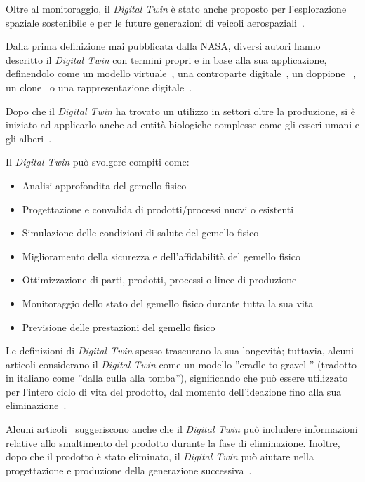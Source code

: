 Oltre al monitoraggio, il \emph{Digital Twin} è stato anche proposto per l'esplorazione spaziale sostenibile e per le future generazioni di veicoli aerospaziali~\cite{NASA}.

Dalla prima definizione mai pubblicata dalla NASA, diversi autori hanno descritto il \emph{Digital Twin} con termini propri e in base alla sua applicazione, definendolo come un modello virtuale~\cite{Fedelta, Airframe_DT, Def_DT, Def2_DT, Gerarchico, Complex_Aerostructures, DTH_DT}, una controparte digitale~\cite{Controparte1, Evolutivo}, un doppione ~\cite{IBM_DT}, un clone~\cite{Clone_DT} o una rappresentazione digitale~\cite{Rappresentazione1, Rappresentazione2, Rappresentazione3}.

Dopo che il \emph{Digital Twin} ha trovato un utilizzo in settori oltre la produzione, si è iniziato ad applicarlo anche ad entità biologiche complesse come gli esseri umani e gli alberi~\cite{Rappresentazione1, Alberi_DT}.

\newpage

Il \emph{Digital Twin} può svolgere compiti come:
\begin{itemize}
    \item Analisi approfondita del gemello fisico
    \item Progettazione e convalida di prodotti/processi nuovi o esistenti
    \item Simulazione delle condizioni di salute del gemello fisico
    \item Miglioramento della sicurezza e dell'affidabilità del gemello fisico
    \item Ottimizzazione di parti, prodotti, processi o linee di produzione
    \item Monitoraggio dello stato del gemello fisico durante tutta la sua vita
    \item Previsione delle prestazioni del gemello fisico
\end{itemize}

Le definizioni di \emph{Digital Twin} spesso trascurano la sua longevità; tuttavia, alcuni articoli considerano il \emph{Digital Twin} come un modello ”cradle-to-gravel ” (tradotto in italiano come ”dalla culla alla tomba”), significando che può essere utilizzato per l'intero ciclo di vita del prodotto, dal momento dell'ideazione fino alla sua eliminazione~\cite{Airframe_DT, Air_force, Culla, Culla2}.

Alcuni articoli~\cite{Economico} suggeriscono anche che il \emph{Digital Twin} può includere informazioni relative allo smaltimento del prodotto durante la fase di eliminazione. Inoltre, dopo che il prodotto è stato eliminato, il \emph{Digital Twin} può aiutare nella progettazione e produzione della generazione successiva~\cite{Riutilizzo}.

